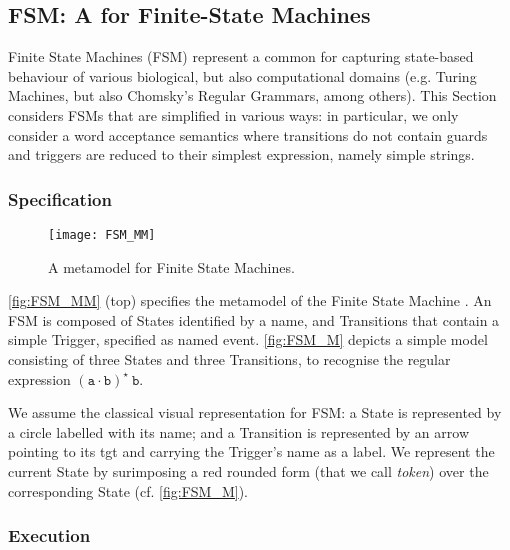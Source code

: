 \subsection{\textsf{FSM}: A \DSL for Finite-State Machines}
\label{sec:Examples:FSM}

Finite State Machines (FSM) represent a common \DSL for capturing state-based 
behaviour of various biological, but also computational domains (e.g. Turing 
Machines, but also Chomsky's Regular Grammars, among others). This Section considers
FSMs that are simplified in various ways: in particular, we only consider a
word acceptance semantics where transitions do not contain guards and triggers are
reduced to their simplest expression, namely simple strings.

\subsubsection{Specification}
\label{sec:Examples:FSM:Specification}

\begin{figure}[t]%
   \centering
   \texttt{[image: FSM\_MM]}%
   \caption{A metamodel for Finite State Machines.}%
   \label{fig:FSM_MM}%
\end{figure}


\autoref{fig:FSM_MM} (top) specifies the metamodel of the Finite State Machine \DSL. 
An \textsf{FSM} is composed of \textsf{State}s identified by a \textsf{name}, and
\textsf{Transition}s that contain a simple \textsf{Trigger}, specified as 
\textsf{name}d event. \autoref{fig:FSM_M} depicts a simple model consisting of 
three \textsf{State}s and three \textsf{Transition}s, to recognise the regular 
expression $\mathtt{(a\cdot b)^\star\ b}$. 

We assume the classical visual representation for \textsf{FSM}: a \textsf{State}
is represented by a circle labelled with its \textsf{name}; and a 
\textsf{Transition} is represented by an arrow pointing to its \textsf{tgt} and 
carrying the \textsf{Trigger}'s name as a label. We represent the \textsf{current}
\textsf{State} by surimposing a red rounded form (that we call \emph{token}) over
the corresponding \textsf{State} (cf. \autoref{fig:FSM_M}).


\subsubsection{Execution}
\label{sec:Examples:FSM:Execution}

